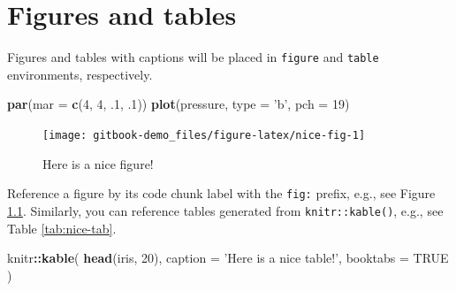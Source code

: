 \documentclass[
]{book}
\newenvironment{Shaded}{\begin{snugshade}}{\end{snugshade}}
\newcommand{\DataTypeTok}[1]{\textcolor[rgb]{0.13,0.29,0.53}{#1}}
\newcommand{\DecValTok}[1]{\textcolor[rgb]{0.00,0.00,0.81}{#1}}
\newcommand{\FloatTok}[1]{\textcolor[rgb]{0.00,0.00,0.81}{#1}}
\newcommand{\KeywordTok}[1]{\textcolor[rgb]{0.13,0.29,0.53}{\textbf{#1}}}
\newcommand{\NormalTok}[1]{#1}
\newcommand{\OperatorTok}[1]{\textcolor[rgb]{0.81,0.36,0.00}{\textbf{#1}}}
\newcommand{\OtherTok}[1]{\textcolor[rgb]{0.56,0.35,0.01}{#1}}
\newcommand{\StringTok}[1]{\textcolor[rgb]{0.31,0.60,0.02}{#1}}
\begin{document}
\hypertarget{figtab}{%
\chapter{Figures and tables}\label{figtab}}

Figures and tables with captions will be placed in \texttt{figure} and \texttt{table} environments, respectively.

\begin{Shaded}
\begin{Highlighting}[]
\KeywordTok{par}\NormalTok{(}\DataTypeTok{mar =} \KeywordTok{c}\NormalTok{(}\DecValTok{4}\NormalTok{, }\DecValTok{4}\NormalTok{, }\FloatTok{.1}\NormalTok{, }\FloatTok{.1}\NormalTok{))}
\KeywordTok{plot}\NormalTok{(pressure, }\DataTypeTok{type =} \StringTok{'b'}\NormalTok{, }\DataTypeTok{pch =} \DecValTok{19}\NormalTok{)}
\end{Highlighting}
\end{Shaded}

\begin{figure}

{\centering \texttt{[image: gitbook-demo\_files/figure-latex/nice-fig-1]} 

}

\caption{Here is a nice figure!}\label{fig:nice-fig}
\end{figure}

Reference a figure by its code chunk label with the \texttt{fig:} prefix, e.g., see Figure \ref{fig:nice-fig}. Similarly, you can reference tables generated from \texttt{knitr::kable()}, e.g., see Table \ref{tab:nice-tab}.

\begin{Shaded}
\begin{Highlighting}[]
\NormalTok{knitr}\OperatorTok{::}\KeywordTok{kable}\NormalTok{(}
  \KeywordTok{head}\NormalTok{(iris, }\DecValTok{20}\NormalTok{), }\DataTypeTok{caption =} \StringTok{'Here is a nice table!'}\NormalTok{,}
  \DataTypeTok{booktabs =} \OtherTok{TRUE}
\NormalTok{)}
\end{Highlighting}
\end{Shaded}
\end{document}
